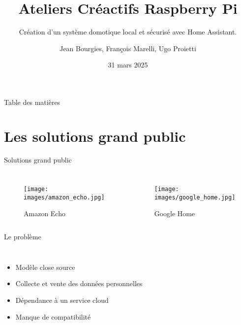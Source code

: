 \documentclass[aspectratio=169,xcolor=dvipsnames]{beamer}
\title{Ateliers Créactifs Raspberry Pi}
\subtitle{Création d'un système domotique local et sécurisé avec Home Assistant.}
\author{Jean Bourgies, François Marelli, Ugo Proietti}
\date{31 mars 2025}
\begin{document}
\begin{frame}
    \titlepage
\end{frame}

\begin{frame}{Table des matières}
    \tableofcontents
\end{frame}

\section{Les solutions grand public}

\begin{frame}{Solutions grand public}
    \begin{columns}[c] %

        \begin{figure}
            \texttt{[image: images/amazon\_echo.jpg]}
            \captionsetup{labelformat=empty}
            \caption{Amazon Echo}
        \end{figure}

        \begin{figure}
            \texttt{[image: images/google\_home.jpg]}
            \captionsetup{labelformat=empty}
            \caption{Google Home}
        \end{figure}

    \end{columns}
\end{frame}

\begin{frame}{Le problème}
    \begin{columns}[c] %

        \begin{itemize}
            \item Modèle close source
            \item Collecte et vente des données personnelles
            \item Dépendance à un service cloud
            \item Manque de compatibilité
        \end{itemize}

    \end{columns}
\end{frame}
\end{document}
